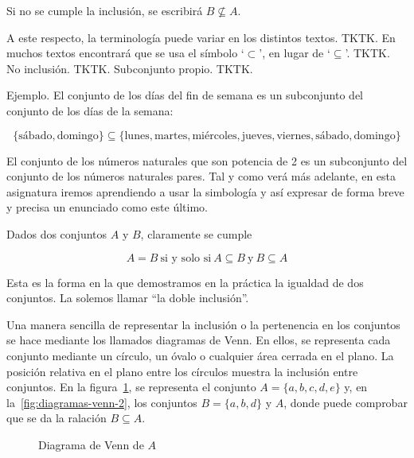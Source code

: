 Si no se cumple la inclusión, se escribirá $B \not\subseteq A$.

A este respecto, la terminología puede variar en los distintos textos. TKTK.
En muchos textos encontrará que se usa el símbolo `$\subset$', en lugar de
`$\subseteq$'. TKTK. No inclusión. TKTK. Subconjunto propio. TKTK.

Ejemplo. El conjunto de los días del fin de semana es un subconjunto del
conjunto de los días de la semana:

$$ \{\text{sábado}, \text{domingo}\} \subseteq \{\text{lunes},
\text{martes}, \text{miércoles}, \text{jueves}, \text{viernes},
\text{sábado}, \text{domingo}\} $$

El conjunto de los números naturales que son potencia de 2 es un subconjunto
del conjunto de los números naturales pares. Tal y como verá más adelante,
en esta asignatura iremos aprendiendo a usar la simbología y así expresar de
forma breve y precisa un enunciado como este último.

Dados dos conjuntos $A$ y $B$, claramente se cumple

$$ A = B \ \text{si y solo si} \ A \subseteq B \ \text{y} \ B \subseteq A $$

\noindent Esta es la forma en la que demostramos en la práctica la igualdad
de dos conjuntos. La solemos llamar ``la doble inclusión''.

Una manera sencilla de representar la inclusión o la pertenencia en los
conjuntos se hace mediante los llamados diagramas de Venn. En ellos, se
representa cada conjunto mediante un círculo, un óvalo o cualquier área
cerrada en el plano. La posición relativa en el plano entre los círculos
muestra la inclusión entre conjuntos. En la
figura~\ref{fig:diagramas-venn-1}, se representa el conjunto $A = \{a, b, c,
d, e\}$ y, en la~\ref{fig:diagramas-venn-2}, los conjuntos $B = \{a, b, d\}$
y $A$, donde puede comprobar que se da la ralación $B \subseteq A$.

\begin{figure}
  \centering
  \caption{Diagrama de Venn de $A$}%
  \label{fig:diagramas-venn-1}
\end{figure}


